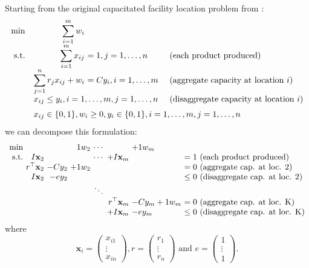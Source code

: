 Starting from the original capacitated facility location problem from :
\[
\begin{array}{rr@{\ }ll}
       \min & \displaystyle \sum_{i=1}^m w_i \\
\text{s.t.} & \displaystyle \sum_{i=1}^m x_{ij}           & = 1, j = 1, \ldots, n      & \text{ (each product produced)} \\
            & \displaystyle \sum_{j=1}^n r_j x_{ij} + w_i & = C y_i, i = 1, \ldots, m  & \text{ (aggregate capacity at location $i$)} \\
            & \multicolumn{2}{l}{x_{ij} \leq y_i, i = 1, \ldots, m, j = 1, \ldots, n}  & \text{ (disaggregate capacity at location $i$)} \\[6pt]
            & \multicolumn{3}{l}{x_{ij} \in \{ 0, 1\}, w_i \geq 0, y_i \in \{0, 1\}, i = 1, \ldots, m, j = 1, \ldots, n}
\end{array}
\]
we can decompose this formulation:
\[
\begin{array}{r@{\ }r@{\ }r@{\ }r@{\ }c@{\ }r@{\ }l@{\ }l}
\min        &                     &        &  1 w_2 & \cdots &                     &  +1 w_m 				\\
\text{s.t.} & I \mathbf{x}_2      &        &        & \cdots & + I \mathbf{x}_m    &         &= 1 \text{ (each product produced)} \\
            & r^\top \mathbf{x}_2 & -C y_2 & +1 w_2 &        &                     &         &= 0 \text{ (aggregate cap. at loc. 2)} \\
            & I \mathbf{x}_2      & -e y_2 &        &        &                     &         &\leq 0 \text{ (disaggregate cap. at loc. 2)}\\
            &                     &        &        & \ddots \\
            &                     &        &        &        & r^\top \mathbf{x}_m & -C y_m +1 w_m  & = 0 \text{ (aggregate cap. at loc. K)}\\
            &                     &        &        &        & + I \mathbf{x}_m    & -e y_m         & \leq 0 \text{ (disaggregate cap. at loc. K)}
\end{array}
\]
where
\[
\mathbf{x}_i = \begin{pmatrix}
x_{i1} \\ \vdots \\ x_{in}
\end{pmatrix}, r = \begin{pmatrix}
r_{1} \\ \vdots \\ r_{n}
\end{pmatrix} \text{ and }
e = \begin{pmatrix}
1 \\ \vdots \\ 1
\end{pmatrix}.
\]
